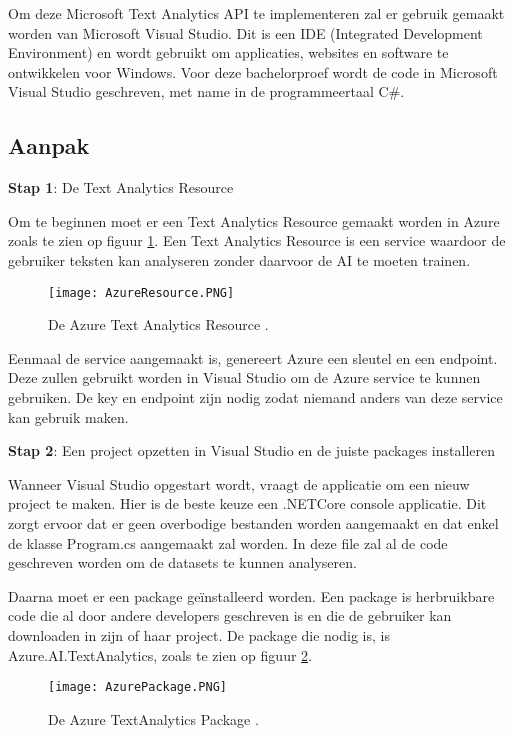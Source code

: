 Om deze Microsoft Text Analytics API te implementeren zal er gebruik gemaakt worden van Microsoft Visual Studio. Dit is een IDE (Integrated Development Environment) en wordt gebruikt om applicaties, websites en software te ontwikkelen voor Windows. Voor deze bachelorproef wordt de code in Microsoft Visual Studio geschreven, met name in de programmeertaal C\#. 

\subsection{Aanpak}
\label{aanpakazure}
\textbf{Stap 1}: De Text Analytics Resource

Om te beginnen moet er een Text Analytics Resource gemaakt worden in Azure zoals te zien op figuur \ref{azureresource}. Een Text Analytics Resource is een service waardoor de gebruiker teksten kan analyseren zonder daarvoor de AI te moeten trainen. \autocite{Microsoft2020}

\begin{figure}[!htbp]
    \texttt{[image: AzureResource.PNG]}
    \caption{\label{azureresource}De Azure Text Analytics Resource \autocite{Microsoft2021}.}
\end{figure}
\FloatBarrier

Eenmaal de service aangemaakt is, genereert Azure een sleutel en een endpoint. Deze zullen gebruikt worden in Visual Studio om de Azure service te kunnen gebruiken. De key en endpoint zijn nodig zodat niemand anders van deze service kan gebruik maken. 

\textbf{Stap 2}: Een project opzetten in Visual Studio en de juiste packages installeren

Wanneer Visual Studio opgestart wordt, vraagt de applicatie om een nieuw project te maken. Hier is de beste keuze een \gls{.NETCore} console applicatie. Dit zorgt ervoor dat er geen overbodige bestanden worden aangemaakt en dat enkel de klasse Program.cs aangemaakt zal worden. In deze file zal al de code geschreven worden om de datasets te kunnen analyseren. \autocite{Microsoft2020}

Daarna moet er een package geïnstalleerd worden. Een \gls{package} is herbruikbare code die al door andere developers geschreven is en die de gebruiker kan downloaden in zijn of haar project. \autocite{Microsoft2018} De \gls{package} die nodig is, is Azure.AI.TextAnalytics, zoals te zien op figuur \ref{azurepackage}.

\begin{figure}[!htbp]
    \texttt{[image: AzurePackage.PNG]}
    \caption{\label{azurepackage}De Azure TextAnalytics Package \autocite{Microsoft2020}.}
\end{figure}
\FloatBarrier


